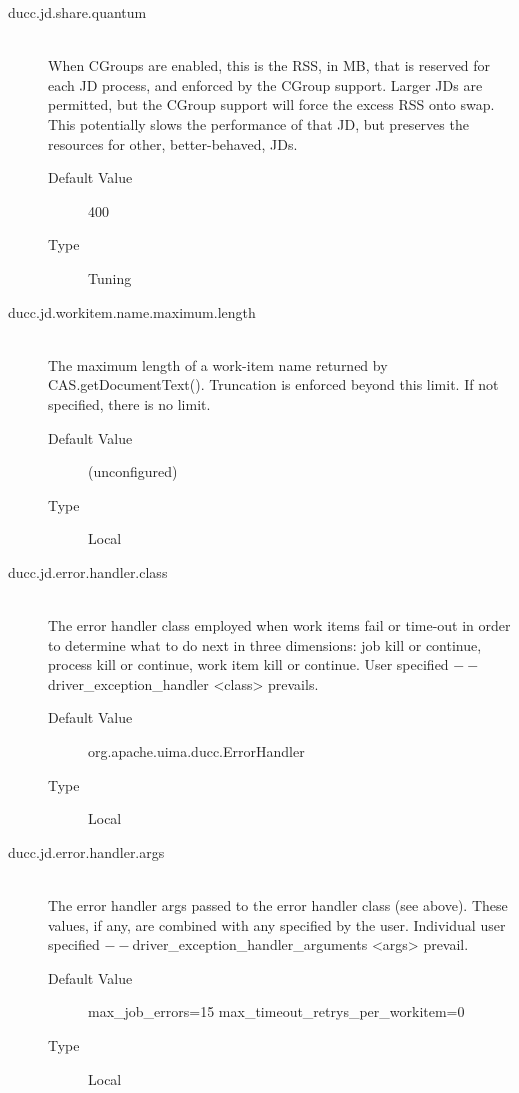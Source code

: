 \begin{description}
        \item[ducc.jd.share.quantum] \hfill \\
          When CGroups are enabled, this is the RSS, in MB, that is reserved for each JD process, and enforced
          by the CGroup support.  Larger JDs are permitted, but the CGroup support will force the excess
          RSS onto swap.  This potentially slows the performance of that JD, but preserves the resources
          for other, better-behaved, JDs.
          \begin{description}
            \item[Default Value] 400
            \item[Type] Tuning 
          \end{description}


        \item[ducc.jd.workitem.name.maximum.length] \hfill \\
          The maximum length of a work-item name returned by CAS.getDocumentText().
          Truncation is enforced beyond this limit.
          If not specified, there is no limit.
          \begin{description}
            \item[Default Value] (unconfigured) 
            \item[Type] Local
          \end{description}
          
        
        \item[ducc.jd.error.handler.class] \hfill \\
          The error handler class employed when work items fail or time-out in order
          to determine what to do next in three dimensions: 
          job kill or continue, process kill or continue, work item kill or continue.
          User specified $--$driver\_exception\_handler <class> prevails.
          \begin{description}
            \item[Default Value] org.apache.uima.ducc.ErrorHandler
            \item[Type] Local
          \end{description}
                  
        \item[ducc.jd.error.handler.args] \hfill \\
          The error handler args passed to the error handler class (see above).
          These values, if any, are combined with any specified by the user.
          Individual user specified $--$driver\_exception\_handler\_arguments <args> 
          prevail.
          \begin{description}
            \item[Default Value] max\_job\_errors=15 max\_timeout\_retrys\_per\_workitem=0
            \item[Type] Local
          \end{description}


\end{description}
